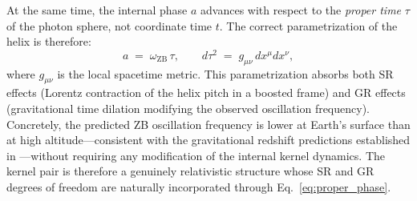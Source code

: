 \documentclass[%
 reprint, amsmath,amssymb, aps, prb, ]{revtex4-2}
\numberwithin{equation}{section}
\newcommand{\omZB}{\omega_{\text{ZB}}}
\begin{document}
At the same time, the internal phase $a$ advances with respect to the \emph{proper time} $\tau$ of the photon sphere, not coordinate time $t$. The correct parametrization of the helix is therefore:
\begin{equation}
a \;=\; \omZB\,\tau, \qquad d\tau^2 \;=\; g_{\mu\nu}\,dx^\mu dx^\nu,
\label{eq:proper_phase}
\end{equation}
where $g_{\mu\nu}$ is the local spacetime metric. This parametrization absorbs both SR effects (Lorentz contraction of the helix pitch in a boosted frame) and GR effects (gravitational time dilation modifying the observed oscillation frequency). Concretely, the predicted ZB oscillation frequency is lower at Earth's surface than at high altitude---consistent with the gravitational redshift predictions established in \cite{hanamura22}---without requiring any modification of the internal kernel dynamics. The kernel pair is therefore a genuinely relativistic structure whose SR and GR degrees of freedom are naturally incorporated through Eq.~\eqref{eq:proper_phase}.
\end{document}
